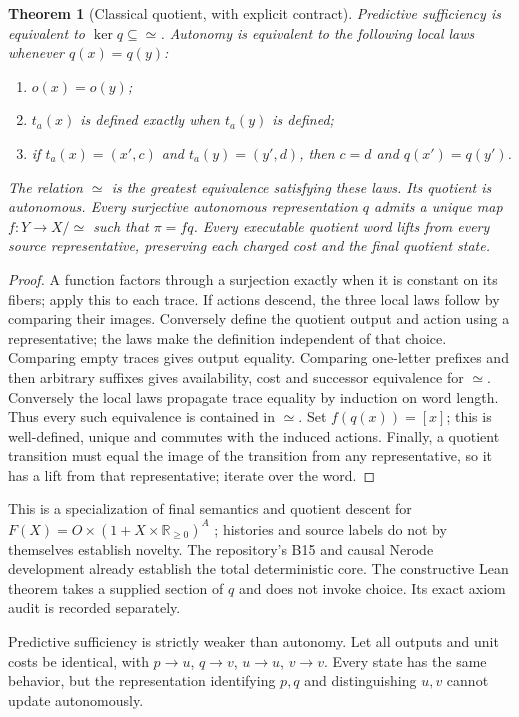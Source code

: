 \documentclass[11pt]{article}
\newtheorem{theorem}{Theorem}
\newcommand{\RR}{\mathbb R}
\begin{document}
\begin{theorem}[Classical quotient, with explicit contract]
Predictive sufficiency is equivalent to $\ker q\subseteq\simeq$.
Autonomy is equivalent to the following local laws whenever $q(x)=q(y)$:
\begin{enumerate}
\item $o(x)=o(y)$;
\item $t_a(x)$ is defined exactly when $t_a(y)$ is defined;
\item if $t_a(x)=(x',c)$ and $t_a(y)=(y',d)$, then $c=d$ and $q(x')=q(y')$.
\end{enumerate}
The relation $\simeq$ is the greatest equivalence satisfying these laws.
Its quotient is autonomous. Every surjective autonomous representation
$q$ admits a unique map $f:Y\to X/{\simeq}$ such that $\pi=fq$.
Every executable quotient word lifts from every source representative,
preserving each charged cost and the final quotient state.
\end{theorem}
\begin{proof}
A function factors through a surjection exactly when it is constant on its
fibers; apply this to each trace. If actions descend, the three local laws
follow by comparing their images. Conversely define the quotient output
and action using a representative; the laws make the definition independent
of that choice. Comparing empty traces gives output equality. Comparing
one-letter prefixes and then arbitrary suffixes gives availability, cost
and successor equivalence for $\simeq$. Conversely the local laws propagate
trace equality by induction on word length. Thus every such equivalence is
contained in $\simeq$. Set $f(q(x))=[x]$; this is well-defined, unique and
commutes with the induced actions. Finally, a quotient transition must equal
the image of the transition from any representative, so it has a lift from
that representative; iterate over the word.
\end{proof}

This is a specialization of final semantics and quotient descent for
$F(X)=O\times(1+X\times\RR_{\ge0})^A$ \cite{rutten,silva}; histories and
source labels do not by themselves establish novelty. The repository's B15
and causal Nerode development already establish the total deterministic core.
The constructive Lean theorem takes a supplied section of $q$ and does not
invoke choice. Its exact axiom audit is recorded separately.

Predictive sufficiency is strictly weaker than autonomy. Let all outputs
and unit costs be identical, with $p\to u$, $q\to v$, $u\to u$, $v\to v$.
Every state has the same behavior, but the representation identifying $p,q$
and distinguishing $u,v$ cannot update autonomously.
\end{document}
